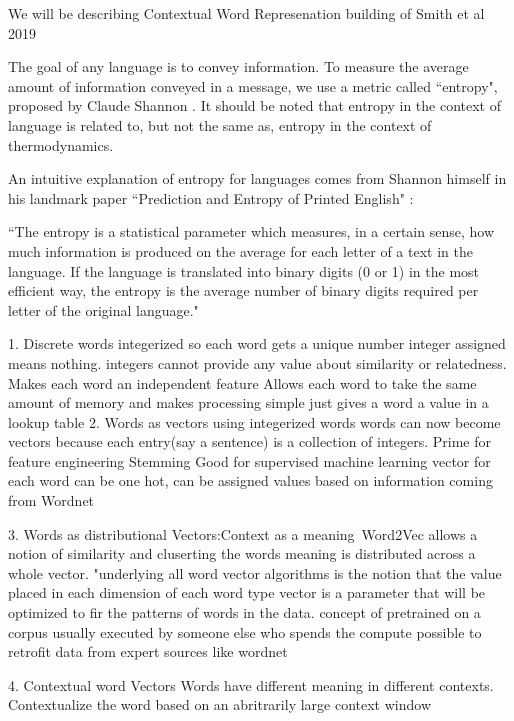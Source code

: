 \documentclass [11pt, proquest] {uwthesis}[2020/08/20]
\begin{document}
We will be describing Contextual Word Represenation building of Smith et al 2019 \cite{Smith2019ContextualWR} 



The goal of any language is to convey information. To measure the average amount of information conveyed in a message, we use a metric called “entropy", proposed by Claude Shannon . It should be noted that entropy in the context of language is related to, but not the same as, entropy in the context of thermodynamics.


An intuitive explanation of entropy for languages comes from Shannon himself in his landmark paper “Prediction and Entropy of Printed English" :

“The entropy is a statistical parameter which measures, in a certain sense, how much information is produced on the average for each letter of a text in the language. If the language is translated into binary digits (0 or 1) in the most efficient way, the entropy is the average number of binary digits required per letter of the original language."


1. Discrete words
    integerized so each word gets a unique number
    integer assigned means nothing. integers cannot provide any value about similarity or relatedness. Makes each word an independent feature
    Allows each word to take the same amount of memory and makes processing simple
    just gives a word a value in a lookup table
2. Words as vectors
    using integerized words words can now become vectors because each entry(say a sentence) is a collection of integers. 
    Prime for feature engineering
    Stemming 
    Good for supervised machine learning 
    vector for each word can be one hot, can be assigned values based on information coming from Wordnet

3. Words as distributional Vectors:Context as a meaning\
    Word2Vec
    allows a notion of similarity and cluserting
    the words meaning is distributed across a whole vector. 
    "underlying all word vector algorithms is the notion that the value placed in each dimension of each word type vector is a parameter that will be optimized to fir the patterns of words in the data. 
    concept of pretrained on a corpus usually executed by someone else who spends the compute
    possible to retrofit data from expert sources like wordnet 

4. Contextual word Vectors
    Words have different meaning in different contexts. 
    Contextualize the word based on an abritrarily large context window
\end{document}
